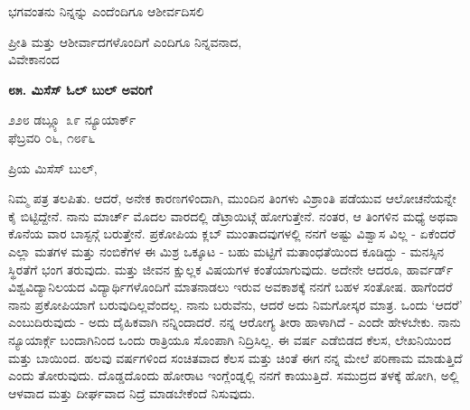 ಭಗವಂತನು ನಿನ್ನನ್ನು ಎಂದೆಂದಿಗೂ ಆಶೀರ್ವದಿಸಲಿ

\begin{flushright}
ಪ್ರೀತಿ ಮತ್ತು ಆಶೀರ್ವಾದಗಳೊಂದಿಗೆ ಎಂದಿಗೂ ನಿನ್ನವನಾದ,\\ವಿವೇಕಾನಂದ
\end{flushright}

\begin{center}
\textbf{೮೫. ಮಿಸೆಸ್ ಓಲ್ ಬುಲ್ ಅವರಿಗೆ}
\end{center}

\begin{flushright}
೨೨೮ ಡಬ್ಲ್ಯೂ ೩೯ ನ್ಯೂಯಾರ್ಕ್\\ಫೆಬ್ರವರಿ ೦೬, ೧೮೯೬
\end{flushright}

ಪ್ರಿಯ ಮಿಸೆಸ್ ಬುಲ್,

ನಿಮ್ಮ ಪತ್ರ ತಲಪಿತು. ಆದರೆ, ಅನೇಕ ಕಾರಣಗಳಿಂದಾಗಿ, ಮುಂದಿನ ತಿಂಗಳು ವಿಶ್ರಾಂತಿ ಪಡೆಯುವ ಆಲೋಚನೆಯನ್ನೇ ಕೈ ಬಿಟ್ಟಿದ್ದೇನೆ. ನಾನು ಮಾರ್ಚ್ ಮೊದಲ ವಾರದಲ್ಲಿ ಡೆಟ್ರಾಯಿಟ್ಗೆ ಹೋಗುತ್ತೇನೆ. ನಂತರ, ಆ ತಿಂಗಳಿನ ಮಧ್ಯೆ ಅಥವಾ ಕೊನೆಯ ವಾರ ಬಾಸ್ಟನ್ಗೆ ಬರುತ್ತೇನೆ. ಪ್ರಕೋಪಿಯ ಕ್ಲಬ್ ಮುಂತಾದವುಗಳಲ್ಲಿ ನನಗೆ ಅಷ್ಟು ವಿಶ್ವಾಸ ವಿಲ್ಲ - ಏಕೆಂದರೆ ಎಲ್ಲಾ ಮತಗಳ ಮತ್ತು ನಂಬಿಕೆಗಳ ಈ ಮಿಶ್ರ ಒಕ್ಕೂಟ - ಬಹು ಮಟ್ಟಿಗೆ ಮತಾಂಧತೆಯಿಂದ ಕೂಡಿದ್ದು - ಮನಸ್ಸಿನ ಸ್ಥಿರತೆಗೆ ಭಂಗ ತರುವುದು. ಮತ್ತು ಜೀವನ ಕ್ಷುಲ್ಲಕ ವಿಷಯಗಳ ಕಂತೆಯಾಗುವುದು. ಅದೇನೇ ಆದರೂ, ಹಾರ್ವರ್ಡ್ ವಿಶ್ವವಿದ್ಯಾನಿಲಯದ ವಿದ್ಯಾರ್ಥಿಗಳೊಂದಿಗೆ ಮಾತನಾಡಲು ಇರುವ ಅವಕಾಶಕ್ಕೆ ನನಗೆ ಬಹಳ ಸಂತೋಷ. ಹಾಗೆಂದರೆ ನಾನು ಪ್ರಕೋಪಿಯಾಗೆ ಬರುವುದಿಲ್ಲವೆಂದಲ್ಲ. ನಾನು ಬರುವೆನು, ಆದರೆ ಅದು ನಿಮಗೋಸ್ಕರ ಮಾತ್ರ. ಒಂದು ‘ಆದರೆ’ ಎಂಬುದಿರುವುದು - ಅದು ದೈಹಿಕವಾಗಿ ನನ್ನಿಂದಾದರೆ. ನನ್ನ ಆರೋಗ್ಯ ತೀರಾ ಹಾಳಾಗಿದೆ - ಎಂದೇ ಹೇಳಬೇಕು. ನಾನು ನ್ಯೂಯಾರ್ಕ್ಗೆ ಬಂದಾಗಿನಿಂದ ಒಂದು ರಾತ್ರಿಯೂ ಸೊಂಪಾಗಿ ನಿದ್ರಿಸಿಲ್ಲ. ಈ ವರ್ಷ ಎಡೆಬಿಡದ ಕೆಲಸ, ಲೇಖನಿಯಿಂದ ಮತ್ತು ಬಾಯಿಂದ. ಹಲವು ವರ್ಷಗಳಿಂದ ಸಂಚಿತವಾದ ಕೆಲಸ ಮತ್ತು ಚಿಂತೆ ಈಗ ನನ್ನ ಮೇಲೆ ಪರಿಣಾಮ ಮಾಡುತ್ತಿದೆ ಎಂದು ತೋರುವುದು. ದೊಡ್ಡದೊಂದು ಹೋರಾಟ ಇಂಗ್ಲೆಂಡ್ನಲ್ಲಿ ನನಗೆ ಕಾಯುತ್ತಿದೆ. ಸಮುದ್ರದ ತಳಕ್ಕೆ ಹೋಗಿ, ಅಲ್ಲಿ ಆಳವಾದ ಮತ್ತು ದೀರ್ಘವಾದ ನಿದ್ರೆ ಮಾಡಬೇಕೆಂದೆ ನಿಸುವುದು.

